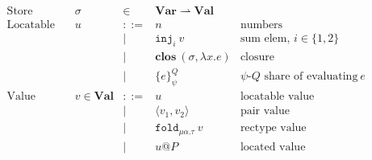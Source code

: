 \documentclass[10pt]{article}
\makeatletter
\newcommand{\kw}[1]{\ensuremath{\mathtt{#1}}}
\newcommand{\trec}[2]{\ensuremath{\mu {#1}.{#2}}}
\newcommand{\ebinop}[2]{\ensuremath{{#1}~\oplus~{#2}}}
\newcommand{\elet}[3]{\ensuremath{\kw{let}~#1\, =\, #2~\kw{in}\;{#3}}}
\newcommand{\ereveal}[4]{\ensuremath{\kw{reveal}^{#1}_{#4}~{#2}~{#3}}}
\newcommand{\econd}[3]{\ensuremath{\kw{match}~{#1}~\kw{with}~x.{#2} \diamond {#3}}}
\newcommand{\emux}[3]{\ensuremath{\kw{mux}~{#1}~\kw{?}~{#2}~\kw{:}~{#3}}}
\newcommand{\eshare}[4]{\ensuremath{\kw{share}^{#2}_{#1}~{#3}~{#4}}}
\newcommand{\einj}[2]{\ensuremath{\kw{inj}_{#1}~{#2}}}
\newcommand{\epair}[2]{\ensuremath{\langle {#1}, {#2} \rangle}}
\newcommand{\eproj}[2]{\ensuremath{\kw{\#}}_{#1}~{#2}}
\newcommand{\elam}[2]{\ensuremath{\lambda {#1}.{#2}}}
\newcommand{\eapp}[2]{\ensuremath{{#1}~{#2}}}
\newcommand{\efold}[2]{\ensuremath{\kw{fold}_{#1}~{#2}}}
\newcommand{\eunfold}[1]{\ensuremath{\kw{unfold}~{#1}}}
\newcommand{\vshare}[3]{\ensuremath{\{{#3}\}^{#1}_{#2}}}
\newcommand{\vloc}[2]{\ensuremath{{#1}\kw{@}{#2}}}
\newcommand{\vclos}[2]{\ensuremath{\mathbf{clos}~({#1},{#2})}}
\newcommand{\env}{\ensuremath{\sigma}}
\makeatother
\begin{document}
\begin{figure}
  \[\begin{array}{rlcll}
      \text{Store} & \sigma & \in & \mathbf{Var} \rightharpoonup \mathbf{Val}\\
      \text{Locatable value} & u & ::=  & n & \text{numbers} \\
                             && \mid & \einj{i}{v} & \text{sum elem, }i \in \{1,2\}\\
                             && \mid & \vclos{\env}{\elam{x}{e}}  & \text{closure} \\
                             && \mid & \vshare{Q}{\psi}{e} & \text{$\psi$-$Q$ share of evaluating $e$} \\
      \text{Value} & v  \in \mathbf{Val} & ::=  & u & \text{locatable value}\\
                       && \mid & \epair{v_1}{v_2} & \text{pair value}\\
                       && \mid & \efold{\trec{\alpha}{\tau}}{v} & \text{rectype value}\\
                       && \mid & \vloc{u}{P} & \text{located value}\\
    \end{array}
  \]


\end{figure}
\end{document}
